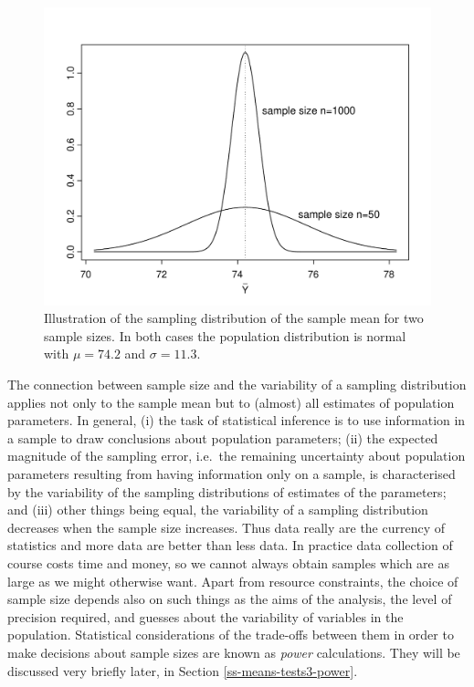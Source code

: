 \documentclass[11pt,a4paper,openany]{book}
\begin{document}
\begin{figure}[htbp]
\centering
\includegraphics[width=12.00000cm]{sampld2_bp.pdf}
\caption{\label{fig:f-sampld2} Illustration of the sampling distribution of
the sample mean for two sample sizes. In both cases the population
distribution is normal with \(\mu=74.2\) and \(\sigma=11.3\).}
\end{figure}

The connection between sample size and the variability of a sampling
distribution applies not only to the sample mean but to (almost) all
estimates of population parameters. In general, (i) the task of
statistical inference is to use information in a sample to draw
conclusions about population parameters; (ii) the expected magnitude of
the sampling error, i.e.~the remaining uncertainty about population
parameters resulting from having information only on a sample, is
characterised by the variability of the sampling distributions of
estimates of the parameters; and (iii) other things being equal, the
variability of a sampling distribution decreases when the sample size
increases. Thus data really are the currency of statistics and more data
are better than less data. In practice data collection of course costs
time and money, so we cannot always obtain samples which are as large as
we might otherwise want. Apart from resource constraints, the choice of
sample size depends also on such things as the aims of the analysis, the
level of precision required, and guesses about the variability of
variables in the population. Statistical considerations of the
trade-offs between them in order to make decisions about sample sizes
are known as \emph{power} calculations. They will be discussed very
briefly later, in Section \ref{ss-means-tests3-power}.
\end{document}
